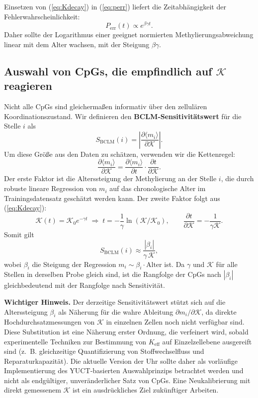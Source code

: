 \documentclass[12pt,a4paper]{article}
\newcommand{\REL}{\mathcal{K}}          %
\begin{document}
	Einsetzen von (\ref{eq:Kdecay}) in (\ref{eq:perr}) liefert die Zeitabhängigkeit der Fehlerwahrscheinlichkeit:
	\[
	P_{\mathrm{err}}(t) \propto e^{\beta\gamma t}.
	\]
	Daher sollte der Logarithmus einer geeignet normierten Methylierungsabweichung linear mit dem Alter wachsen, mit der Steigung \(\beta\gamma\).
	
	\subsection{Auswahl von CpGs, die empfindlich auf \(\REL\) reagieren}
	Nicht alle CpGs sind gleichermaßen informativ über den zellulären Koordinationszustand. Wir definieren den \textbf{BCLM‑Sensitivitätswert} für die Stelle \(i\) als
	\begin{equation}
		S_{\mathrm{BCLM}}(i) = \left| \frac{\partial \langle m_i \rangle}{\partial \REL} \right|.
		\label{eq:sensitivity}
	\end{equation}
	Um diese Größe aus den Daten zu schätzen, verwenden wir die Kettenregel:
	\[
	\frac{\partial \langle m_i \rangle}{\partial \REL} = \frac{\partial \langle m_i \rangle}{\partial t} \cdot \frac{\partial t}{\partial \REL}.
	\]
	Der erste Faktor ist die Alterssteigung der Methylierung an der Stelle \(i\), die durch robuste lineare Regression von \(m_i\) auf das chronologische Alter im Trainingsdatensatz geschätzt werden kann. Der zweite Faktor folgt aus (\ref{eq:Kdecay}):
	\[
	\REL(t) = \REL_0 e^{-\gamma t} \;\Longrightarrow\; t = -\frac{1}{\gamma}\ln(\REL/\REL_0),\qquad
	\frac{\partial t}{\partial \REL} = -\frac{1}{\gamma \REL}.
	\]
	Somit gilt
	\[
	S_{\mathrm{BCLM}}(i) \approx \frac{|\beta_i|}{\gamma \, \REL},
	\]
	wobei \(\beta_i\) die Steigung der Regression \(m_i \sim \beta_i \cdot \text{Alter}\) ist. Da \(\gamma\) und \(\REL\) für alle Stellen in derselben Probe gleich sind, ist die Rangfolge der CpGs nach \(|\beta_i|\) gleichbedeutend mit der Rangfolge nach Sensitivität.
	
	\textbf{Wichtiger Hinweis.}
	Der derzeitige Sensitivitätswert stützt sich auf die Alterssteigung \(\beta_i\) als Näherung für die wahre Ableitung \(\partial m_i/\partial \REL\), da direkte Hochdurchsatzmessungen von \(\REL\) in einzelnen Zellen noch nicht verfügbar sind.
	Diese Substitution ist eine Näherung erster Ordnung, die verfeinert wird, sobald experimentelle Techniken zur Bestimmung von \(K_{\mathrm{eff}}\) auf Einzelzellebene ausgereift sind (z.~B. gleichzeitige Quantifizierung von Stoffwechselfluss und Reparaturkapazität).
	Die aktuelle Version der Uhr sollte daher als vorläufige Implementierung des YUCT‑basierten Auswahlprinzips betrachtet werden und nicht als endgültiger, unveränderlicher Satz von CpGs.
	Eine Neukalibrierung mit direkt gemessenem \(\REL\) ist ein ausdrückliches Ziel zukünftiger Arbeiten.
	
\end{document}
